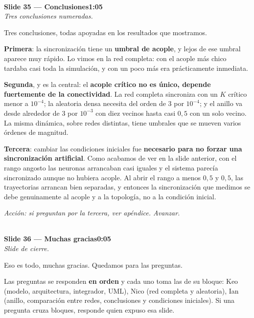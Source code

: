 \documentclass[11pt]{article}
\newcommand{\slide}[3]{%
  \vspace{6pt}%
  \noindent{\color{azulOscuro}\rule{3.2cm}{2pt}}\\[2pt]
  \noindent\textbf{\color{azulOscuro}#1}\hfill\textbf{\color{azulMedio}#3}\\[-2pt]
  {\small\color{grisTexto}\itshape #2}\\[2pt]
}
\begin{document}
\slide{Slide 35 — Conclusiones}{Tres conclusiones numeradas.}{1:05}
\begin{guion}
Tres conclusiones, todas apoyadas en los resultados que mostramos.

\textbf{Primera}: la sincronización tiene un \textbf{umbral de acople}, y lejos de ese umbral aparece muy rápido. Lo vimos en la red completa: con el acople más chico tardaba casi toda la simulación, y con un poco más era prácticamente inmediata.

\textbf{Segunda}, y es la central: el \textbf{acople crítico no es único, depende fuertemente de la conectividad}. La red completa sincroniza con un $K$ crítico menor a $10^{-4}$; la aleatoria densa necesita del orden de $3$ por $10^{-4}$; y el anillo va desde alrededor de $3$ por $10^{-3}$ con diez vecinos hasta casi $0{,}5$ con un solo vecino. La misma dinámica, sobre redes distintas, tiene umbrales que se mueven varios órdenes de magnitud.

\textbf{Tercera}: cambiar las condiciones iniciales fue \textbf{necesario para no forzar una sincronización artificial}. Como acabamos de ver en la slide anterior, con el rango angosto las neuronas arrancaban casi iguales y el sistema parecía sincronizado aunque no hubiera acople. Al abrir el rango a menos $0{,}5$ y $0{,}5$, las trayectorias arrancan bien separadas, y entonces la sincronización que medimos se debe genuinamente al acople y a la topología, no a la condición inicial.
\end{guion}
\textit{Acción: si preguntan por la tercera, ver apéndice. Avanzar.}

\slide{Slide 36 — Muchas gracias}{Slide de cierre.}{0:05}
\begin{guion}
Eso es todo, muchas gracias. Quedamos para las preguntas.
\end{guion}

\vspace{10pt}
\begin{tcolorbox}[colback=azulClaro, colframe=ianColor, arc=2pt, title=\textbf{Reparto de preguntas (guía 3.2)}]
\small Las preguntas se responden \textbf{en orden} y cada uno toma las de su bloque: Keo (modelo, arquitectura, integrador, UML), Nico (red completa y aleatoria), Ian (anillo, comparación entre redes, conclusiones y condiciones iniciales). Si una pregunta cruza bloques, responde quien expuso esa slide.
\end{tcolorbox}

\newpage
\end{document}
